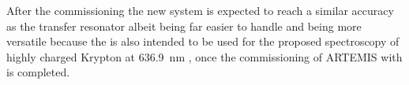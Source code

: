After the commissioning the new system is expected to reach a similar accuracy as the transfer resonator albeit being far easier to handle and being more versatile because the  is also intended to be used for the proposed spectroscopy of highly charged Krypton  at \qty{636.9}{\nm} \cite{krypton17+,krypton17+_2}, once the commissioning of ARTEMIS with  is completed.
